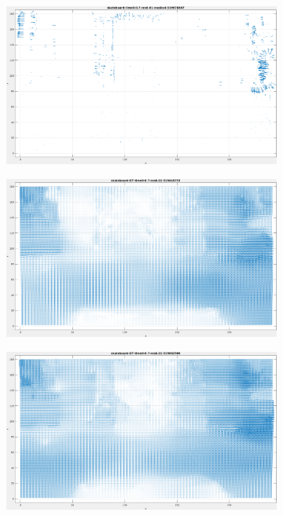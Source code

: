 \begin{appendix}
\begin{figure}[tb]
\begin{subfigure}{.45\textwidth}
  \caption{}
\end{subfigure}
\begin{subfigure}{.45\textwidth}
  \centering
  \includegraphics[height=.6\linewidth]{figs/skateboard/skateboard-masked-2.png}
  \caption{}
\end{subfigure}
\begin{subfigure}{.45\textwidth}
  \centering
  \includegraphics[height=.6\linewidth]{figs/skateboard/skateboard-GT-1.png}
  \caption{}
\end{subfigure}
\begin{subfigure}{.45\textwidth}
  \centering
  \includegraphics[height=.6\linewidth]{figs/skateboard/skateboard-GT-2.png}

\end{subfigure}
\end{figure}
\end{appendix}
